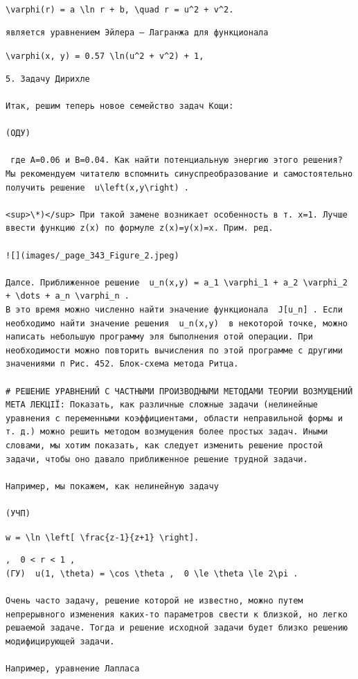 \documentclass[
  ukrainian,
]{article}
\begin{document}
\texttt{\textbackslash{}varphi(r)\ =\ a\ \textbackslash{}ln\ r\ +\ b,\ \textbackslash{}quad\ r\ =\ u\^{}2\ +\ v\^{}2.}

\begin{verbatim}
является уравнением Эйлера — Лагранжа для функционала
\end{verbatim}

\texttt{\textbackslash{}varphi(x,\ y)\ =\ 0.57\ \textbackslash{}ln(u\^{}2\ +\ v\^{}2)\ +\ 1,}

\begin{verbatim}
5. Задачу Дирихле

Итак, решим теперь новое семейство задач Кощи:

(ОДУ)

 где A=0.06 и B=0.04. Как найти потенциальную энергию этого решения? Мы рекомендуем читателю вспомнить синуспреобразование и самостоятельно получить решение  u\left(x,y\right) .

<sup>\*)</sup> При такой замене возникает особенность в т. x=1. Лучше ввести функцию z(x) по формуле z(x)=y(x)=x. Прим. ред.

![](images/_page_343_Figure_2.jpeg)

Далсе. Приближенное решение  u_n(x,y) = a_1 \varphi_1 + a_2 \varphi_2 + \dots + a_n \varphi_n .
В это время можно численно найти эначение функционала  J[u_n] . Если необходимо найти значение решения  u_n(x,y)  в некоторой точке, можно написать небольшую программу эля быполнения отой операции. При необходимости можно повторить вычисления по этой программе с другими значениями п Рис. 452. Блок-схема метода Ритца.

# РЕШЕНИЕ УРАВНЕНИЙ С ЧАСТНЫМИ ПРОИЗВОДНЫМИ МЕТОДАМИ ТЕОРИИ ВОЗМУЩЕНИЙ МЕТА ЛЕКЦІЇ: Показать, как различные сложные задачи (нелинейные уравнения с переменными коэффициентами, области неправильной формы и т. д.) можно решить методом возмущения более простых задач. Иными словами, мы хотим показать, как следует изменить решение простой задачи, чтобы оно давало приближенное решение трудной задачи.

Например, мы покажем, как нелинейную задачу

(УЧП)
\end{verbatim}

\texttt{w\ =\ \textbackslash{}ln\ \textbackslash{}left{[}\ \textbackslash{}frac\{z-1\}\{z+1\}\ \textbackslash{}right{]}.}

\begin{verbatim}
,  0 < r < 1 ,  
(ГУ)  u(1, \theta) = \cos \theta ,  0 \le \theta \le 2\pi .

Очень часто задачу, решение которой не известно, можно путем непрерывного изменения каких-то параметров свести к близкой, но легко решаемой задаче. Тогда и решение исходной задачи будет близко решению модифицирующей задачи.

Например, уравнение Лапласа
\end{verbatim}
\end{document}
